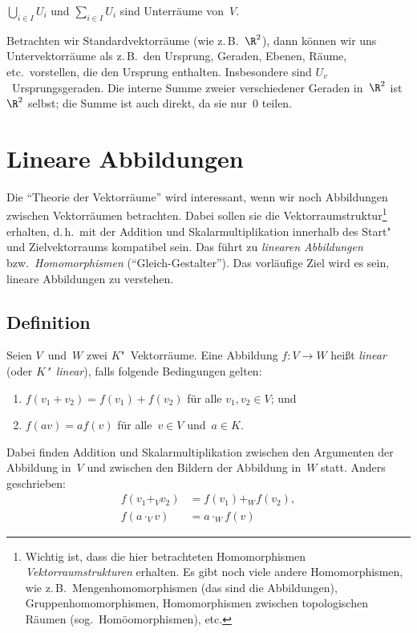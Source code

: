 \documentclass[a4paper]{article}
\begin{document}
\begin{lemma}
    $\bigcup_{i\in I} U_i$ und $\sum_{i\in I} U_i$ sind Unterräume von~$V$.
\end{lemma}

Betrachten wir Standardvektorräume (wie z.\,B.~$\R^2$), dann können wir uns Untervektorräume als z.\,B.\ den Ursprung, Geraden, Ebenen, Räume, etc.\ vorstellen, die den Ursprung enthalten. Insbesondere sind $U_v$~Ursprungsgeraden. Die interne Summe zweier verschiedener Geraden in~$\R^2$ ist~$\R^2$ selbst; die Summe ist auch direkt, da sie nur~0 teilen.

\section{Lineare Abbildungen}

Die "`Theorie der Vektorräume"' wird interessant, wenn wir noch Abbildungen zwischen Vektorräumen betrachten. Dabei sollen sie die Vektorraumstruktur\footnote{Wichtig ist, dass die hier betrachteten Homomorphismen \emph{Vektorraumstrukturen} erhalten. Es gibt noch viele andere Homomorphismen, wie z.\,B.\ Mengenhomomorphismen (das sind die Abbildungen), Gruppenhomomorphismen, Homomorphismen zwischen topologischen Räumen (sog.\ Homöomorphismen), etc.} erhalten, d.\,h.\ mit der Addition und Skalarmultiplikation innerhalb des Start"~ und Zielvektorraums kompatibel sein. Das führt zu \emph{linearen Abbildungen} bzw.\ \emph{Homomorphismen} ("`Gleich-Gestalter"'). Das vorläufige Ziel wird es sein, lineare Abbildungen zu verstehen.

\subsection{Definition}

\begin{definition}
    Seien $V$~und~$W$ zwei $K$"~Vektorräume. Eine Abbildung $f\colon V \to W$ heißt \emph{linear} (oder \emph{$K$"~linear}), falls folgende Bedingungen gelten:
    \begin{enumerate}
        \item $f(v_1+v_2) = f(v_1)+f(v_2)$ für alle $v_1,v_2 \in V$; und
        \item $f(av) = af(v)$ für alle~$v \in V$ und~$a \in K$.
    \end{enumerate}
\end{definition}

Dabei finden Addition und Skalarmultiplikation zwischen den Argumenten der Abbildung in~$V$ und zwischen den Bildern der Abbildung in~$W$ statt. Anders geschrieben:
\begin{align*}
    f(v_1\mathrel{+_V}v_2) &= f(v_1)\mathrel{+_W}f(v_2), \\
    f(a\mathrel{\cdot_V}v) &= a\mathrel{\cdot_W}f(v)
\end{align*}
\end{document}
